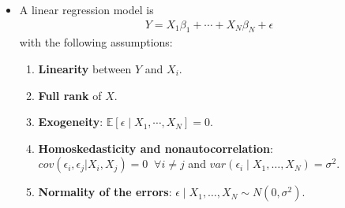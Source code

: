 \documentclass[10pt]{article}
\newcommand{\Ebb}{\mathbb{E}}
\newenvironment{exercise}[2][Exercise]{\begin{trivlist}
  \item[\hskip \labelsep {\bfseries #1}\hskip \labelsep {\bfseries #2.}]}{\end{trivlist}}
\begin{document}
\begin{exercise}{1}
\begin{itemize}
          \item
            A linear regression model is
            \begin{align*}
              Y = X_1 \beta_1 + \cdots + X_N \beta_N + \epsilon
            \end{align*}
            with the following assumptions:
            \begin{enumerate}[\textbf{A}1.]
              \item \textbf{Linearity} between $Y$ and $X_i$.
              \item \textbf{Full rank}  of $X$.
              \item \textbf{Exogeneity}: $\Ebb\left[ \epsilon \mid X_1,
                  \cdots, X_N \right] = 0$.
              \item \textbf{Homoskedasticity and nonautocorrelation}: 
                $cov(\epsilon_i, \epsilon_j | X_i, X_j) = 0 \;\; \forall i \neq j$
                and $var(\epsilon_i \mid X_1, \ldots, X_N) = \sigma^2$.
              \item \textbf{Normality of the errors}: $\epsilon \mid X_1,
                \ldots, X_N \sim N(0, \sigma^2)$.
            \end{enumerate}

            

    \end{itemize}
  \end{exercise}
\end{document}
